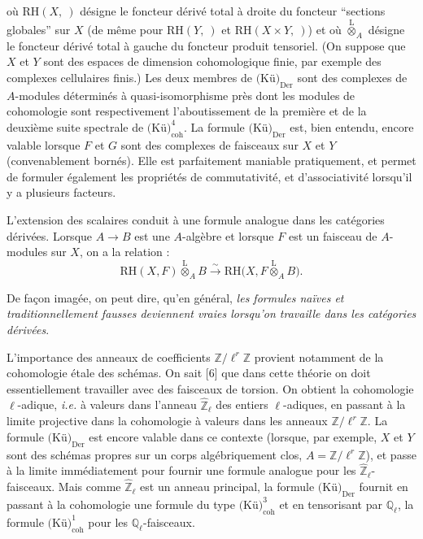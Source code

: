 %
où $\mathrm{RH}(X,{\ })$ désigne le foncteur dérivé total à droite du foncteur
``sections globales'' sur $X$ (de même pour $\mathrm{RH}(Y,{\ })$ et
$\mathrm{RH}(X\times Y,{\ })$) et où $\overset{\mathrm L}{\otimes}_A$
désigne le foncteur dérivé total à gauche du foncteur produit tensoriel. (On
suppose que $X$ et $Y$ sont des espaces de dimension cohomologique finie, par
exemple des complexes cellulaires finis.) Les deux membres de
$\text{(Kü)}_{\mathrm{Der}}$ sont des complexes de $A$-modules
déterminés à quasi-isomorphisme près dont les modules de cohomologie sont
respectivement l'aboutissement de la première et de la deuxième suite
spectrale de $\text{(Kü)}_{\mathrm{coh}}^{4}$. La formule
$\text{(Kü)}_{\mathrm{Der}}$ est, bien entendu, encore valable
lorsque $F$ et $G$ sont des complexes de faisceaux sur $X$ et $Y$
(convenablement bornés). Elle est parfaitement maniable pratiquement, et
permet de formuler également les propriétés de commutativité, et
d'associativité lorsqu'il y a plusieurs facteurs.

L'extension des scalaires conduit à une formule analogue dans les catégories
dérivées. Lorsque $A\to B$ est une $A$-algèbre et lorsque $F$ est un faisceau
de $A$-modules sur $X$, on a la relation :
\[
\mathrm{RH}(X,F)\overset{\mathrm L}{\otimes}_A B
\xrightarrow{\sim}
\mathrm{RH}\bigl(X,F\overset{\mathrm L}{\otimes}_A B\bigr).
\]

De façon imagée, on peut dire, qu'en général,
\emph{les formules naïves et traditionnellement fausses deviennent vraies
lorsqu'on travaille dans les catégories dérivées}.

L'importance des anneaux de coefficients $\mathbb Z/\ell^r\mathbb Z$ provient
notamment de la cohomologie étale des schémas. On sait [6] que dans cette
théorie on doit essentiellement travailler avec des faisceaux de torsion. On
obtient la cohomologie $\ell$-adique, \emph{i.e.} à valeurs dans l'anneau
$\widehat{\mathbb Z}_{\ell}$ des entiers $\ell$-adiques, en passant à la
limite projective dans la cohomologie à valeurs dans les anneaux
$\mathbb Z/\ell^r\mathbb Z$. La formule
$\text{(Kü)}_{\mathrm{Der}}$ est encore valable dans ce contexte
(lorsque, par exemple, $X$ et $Y$ sont des schémas propres sur un corps
algébriquement clos, $A=\mathbb Z/\ell^r\mathbb Z$), et passe à la limite
immédiatement pour fournir une formule analogue pour les
$\widehat{\mathbb Z}_{\ell}$-faisceaux. Mais comme
$\widehat{\mathbb Z}_{\ell}$ est un anneau principal, la formule
$\text{(Kü)}_{\mathrm{Der}}$ fournit en passant à la cohomologie une
formule du type $\text{(Kü)}_{\mathrm{coh}}^{3}$ et en tensorisant
par $\mathbb Q_{\ell}$, la formule
$\text{(Kü)}_{\mathrm{coh}}^{1}$ pour les
$\mathbb Q_{\ell}$-faisceaux.

